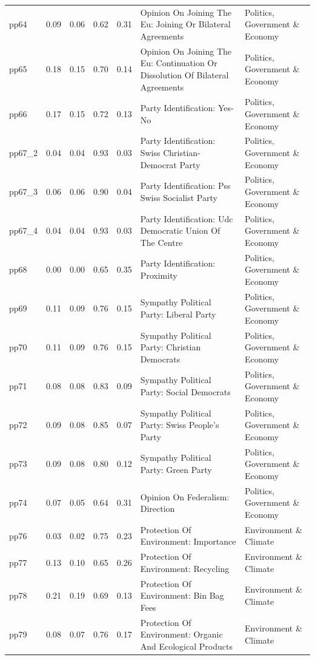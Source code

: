 \documentclass[
  12pt,
]{article}
\begin{document}
\begin{landscape}
\begin{scriptsize}
\begin{longtable}{|p{1.75in}|p{0.3in}|p{0.3in}|p{0.3in}|p{0.3in}|p{2.5in}|p{2.5in}}
pp64 & 0.09 & 0.06 & 0.62 & 0.31 & Opinion On Joining The Eu: Joining Or Bilateral Agreements & Politics, Government \& Economy \\ 
pp65 & 0.18 & 0.15 & 0.70 & 0.14 & Opinion On Joining The Eu: Continuation Or Dissolution Of Bilateral Agreements & Politics, Government \& Economy \\ 
pp66 & 0.17 & 0.15 & 0.72 & 0.13 & Party Identification: Yes-No & Politics, Government \& Economy \\ 
pp67\_2 & 0.04 & 0.04 & 0.93 & 0.03 & Party Identification: Swiss Christian-Democrat Party & Politics, Government \& Economy \\ 
pp67\_3 & 0.06 & 0.06 & 0.90 & 0.04 & Party Identification: Pss Swiss Socialist Party & Politics, Government \& Economy \\ 
pp67\_4 & 0.04 & 0.04 & 0.93 & 0.03 & Party Identification: Udc Democratic Union Of The Centre & Politics, Government \& Economy \\ 
pp68 & 0.00 & 0.00 & 0.65 & 0.35 & Party Identification: Proximity & Politics, Government \& Economy \\ 
pp69 & 0.11 & 0.09 & 0.76 & 0.15 & Sympathy Political Party: Liberal Party & Politics, Government \& Economy \\ 
pp70 & 0.11 & 0.09 & 0.76 & 0.15 & Sympathy Political Party: Christian Democrats & Politics, Government \& Economy \\ 
pp71 & 0.08 & 0.08 & 0.83 & 0.09 & Sympathy Political Party: Social Democrats & Politics, Government \& Economy \\ 
pp72 & 0.09 & 0.08 & 0.85 & 0.07 & Sympathy Political Party: Swiss People's Party & Politics, Government \& Economy \\ 
pp73 & 0.09 & 0.08 & 0.80 & 0.12 & Sympathy Political Party: Green Party & Politics, Government \& Economy \\ 
pp74 & 0.07 & 0.05 & 0.64 & 0.31 & Opinion On Federalism: Direction & Politics, Government \& Economy \\ 
pp76 & 0.03 & 0.02 & 0.75 & 0.23 & Protection Of Environment: Importance & Environment \& Climate \\ 
pp77 & 0.13 & 0.10 & 0.65 & 0.26 & Protection Of Environment: Recycling & Environment \& Climate \\ 
pp78 & 0.21 & 0.19 & 0.69 & 0.13 & Protection Of Environment: Bin Bag Fees & Environment \& Climate \\ 
pp79 & 0.08 & 0.07 & 0.76 & 0.17 & Protection Of Environment: Organic And Ecological Products & Environment \& Climate \\ 

\end{longtable}
\end{scriptsize}
\end{landscape}
\end{document}
